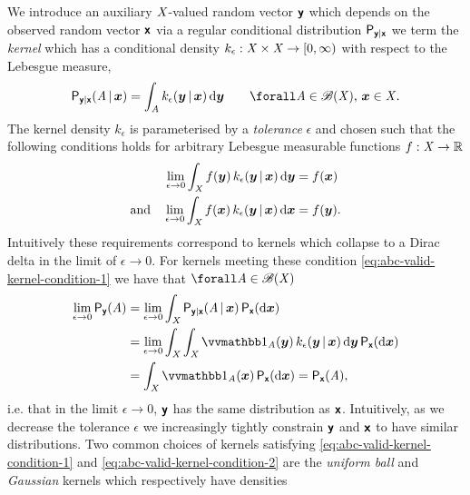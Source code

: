 We introduce an auxiliary $\mathit{X}$-valued random vector $\boldsymbol{\mathsf{y}}$ which depends on the observed random vector $\boldsymbol{\mathsf{x}}$ via a regular conditional distribution $\mathsf{P}_{\boldsymbol{\mathsf{y}}|\boldsymbol{\mathsf{x}}}$ we term the \emph{kernel} which has a conditional density $k_\epsilon : \mathit{X} \times \mathit{X} \to [0, \infty)$ with respect to the Lebesgue measure,
\begin{equation}\label{eq:abc-kernel}
  \prob{\rvct{y}|\rvct{x}}\lpa \set{A} \gvn \vct{x} \rpa = 
  \int_{\set{A}} k_{\epsilon}(\vct{y}\gvn \vct{x}) \,\dr\vct{y}
  \qquad \forall \set{A} \in \borel(\set{X}),\,\vct{x}\in\set{X}.
\end{equation}
The kernel density $k_\epsilon$ is parameterised by a \emph{tolerance} $\epsilon$ and chosen such that the following conditions holds for arbitrary Lebesgue measurable functions $f : \mathit{X} \to \mathbb{R}$
\begin{align}
  \label{eq:abc-valid-kernel-condition-1}
  \lim_{\epsilon \to 0} \int_{\mathit{X}} f(\boldsymbol{y}) \, k_{\epsilon}(\boldsymbol{y}\operatorname{|} \boldsymbol{x}) \,\mathrm{d}\boldsymbol{y}
  &= f(\boldsymbol{x})\\
  \label{eq:abc-valid-kernel-condition-2}
  \textrm{and}\quad
  \lim_{\epsilon \to 0} \int_{\mathit{X}} f(\boldsymbol{x}) \, k_{\epsilon}(\boldsymbol{y}\operatorname{|} \boldsymbol{x}) \,\mathrm{d}\boldsymbol{x}
  &= f(\boldsymbol{y}).
\end{align}
Intuitively these requirements correspond to kernels which collapse to a Dirac delta in the limit of $\epsilon \to 0$. For kernels meeting these condition \eqref{eq:abc-valid-kernel-condition-1} we have that $\forall \set{A} \in \borel(\set{X})$
\begin{equation}\label{eq:abc-marginal-distribution-convergence}
\begin{split}
  \lim_{\epsilon \to 0 } \prob{\rvct{y}}(\set{A}) &=
  \lim_{\epsilon \to 0} 
  \int_{\set{X}}
    \prob{\rvct{y}|\rvct{x}}\lpa \set{A} \gvn \vct{x} \rpa
  \,\prob{\rvct{x}}(\dr \vct{x})\\
  &=
  \lim_{\epsilon \to 0 } 
  \int_{\set{X}} \int_{\set{X}} 
    \ind{\set{A}}(\vct{y}) \, k_{\epsilon}(\vct{y}\gvn \vct{x}) 
  \,\dr\vct{y} \,\prob{\rvct{x}}(\dr \vct{x})\\
  &=
  \int_{\set{X}} \ind{\set{A}}(\vct{x}) \,\prob{\rvct{x}}(\dr \vct{x}) =
  \prob{\rvct{x}}(\set{A}),
\end{split}
\end{equation}
i.e. that in the limit $\epsilon \to 0$, $\boldsymbol{\mathsf{y}}$ has the same distribution as $\boldsymbol{\mathsf{x}}$. Intuitively, as we decrease the tolerance $\epsilon$ we increasingly tightly constrain $\boldsymbol{\mathsf{y}}$ and $\boldsymbol{\mathsf{x}}$ to have similar distributions. Two common choices of kernels satisfying \eqref{eq:abc-valid-kernel-condition-1} and \eqref{eq:abc-valid-kernel-condition-2} are the \emph{uniform ball} and \emph{Gaussian} kernels which respectively have densities
